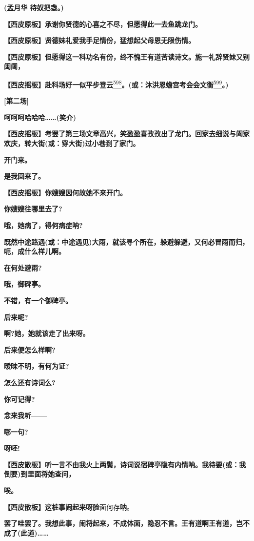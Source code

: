 \textbf{(孟月华 待奴把盏。)}

\textbf{【西皮原板】承谢你贤德的心喜之不尽，但愿得此一去鱼跳龙门。}

\textbf{【西皮原板】贤德妹礼爱我手足情份，猛想起父母恩无限伤情。}

\textbf{【西皮原板】但愿得这一科功名有份，终不愧王有道苦读诗文。施一礼辞贤妹又别闺阃，}

\textbf{【西皮摇板】赴科场好一似平步登云}\protect\hyperlink{fn598}{\textsuperscript{598}}\textbf{。(或：沐洪恩蟾宫考会会文衡}\protect\hyperlink{fn599}{\textsuperscript{599}}\textbf{。)}

\textbf{{[}第二场{]}}

\textbf{呵呵呵哈哈哈\ldots{}\ldots{}(笑介)}

\textbf{【西皮摇板】考罢了第三场文章高兴，笑盈盈喜孜孜出了龙门。回家去细说与阖家欢庆，转大街(或：穿大街)过小巷到了家门。}

\textbf{开门来。}

\textbf{是我回来了。}

\textbf{【西皮摇板】你嫂嫂因何故她不来开门。}

\textbf{你嫂嫂往哪里去了?}

\textbf{哦，她病了，得何病症呐?}

\textbf{既然中途路遇(或：中途遇见)大雨，就该寻个所在，躲避躲避，又何必冒雨而归，呃，成什么样儿啊。}

\textbf{在何处避雨?}

\textbf{哦，御碑亭。}

\textbf{不错，有一个御碑亭。}

\textbf{后来呢?}

\textbf{啊?她，她就该走了出来呀。}

\textbf{后来便怎么样啊?}

\textbf{暧昧不明，有何为证?}

\textbf{怎么还有诗词么?}

\textbf{你可记得?}

\textbf{念来我听------}

\textbf{哪一句?}

\textbf{呀呸!}

\textbf{【西皮散板】听一言不由我火上两鬓，诗词说宿碑亭隐有内情呐。我待要(或：我倒要)到里面将她查问，}

\textbf{唉。}

\textbf{【西皮散板】这桩事闹起来呀脸}面何存\textbf{呐}。

\textbf{罢了哇罢了。我想此事，闹将起来，不成体面，隐忍不言。王有道啊王有道，岂不成了(此道)\ldots{}\ldots{}}

